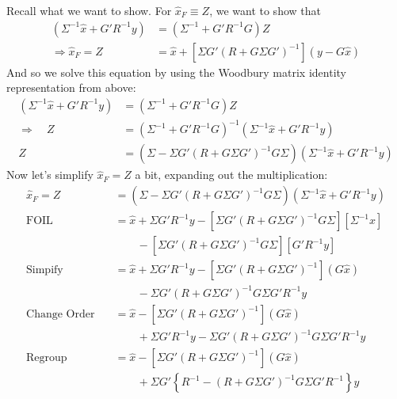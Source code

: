 \documentclass[a4paper,12pt]{article}
\begin{document}
Recall what we want to show.  For $\hat{x}_F \equiv Z$, we want
to show that
\begin{align*}
    (\Sigma^{-1} \hat{x} + G'R^{-1}y) 
	&= \left( \Sigma^{-1} + G'R^{-1}G\right) Z \\
    \Rightarrow 
    \hat{x}_F = Z 
        &= \hat{x} 
        + \left[\Sigma G' (R + G \Sigma G')^{-1}  \right]
        \left( y - G \hat{x} \right)  
\end{align*}
And so we solve this equation by using the Woodbury matrix
identity representation from above:
\begin{align*}
    (\Sigma^{-1} \hat{x} + G'R^{-1}y) &= 
	\left( \Sigma^{-1} + G'R^{-1}G\right) Z \\
    \Rightarrow \quad Z &=
	\left( \Sigma^{-1} + G'R^{-1}G\right)^{-1} 
	(\Sigma^{-1} \hat{x} + G'R^{-1}y) \\
    Z &= 
	\left( \Sigma - \Sigma G'(R 
	+ G\Sigma G')^{-1}
	G\Sigma\right) \left(\Sigma^{-1} \hat{x} 
	+ G'R^{-1}y\right)
\end{align*}
Now let's simplify $\hat{x}_F = Z$ a bit, 
expanding out the multiplication:
\begin{align*}
    \hat{x}_F = Z &= 
	\left( \Sigma - \Sigma G'(R 
	+ G\Sigma G')^{-1}
	G\Sigma\right) \left(\Sigma^{-1} \hat{x} 
	+ G'R^{-1}y\right) \\
    \text{FOIL} \quad &= \hat{x} + \Sigma G' R^{-1} y - 
	\left[\Sigma G' (R + G \Sigma G')^{-1} G \Sigma\right]
	\left[ \Sigma^{-1} \hat{x} \right]  \\
    &\qquad - \left[\Sigma G' (R+ G \Sigma G')^{-1}G\Sigma \right]
	\left[G' R^{-1} y \right] \\
    \text{Simpify} \quad &= \hat{x} + \Sigma G' R^{-1} y - 
	\left[\Sigma G' (R + G \Sigma G')^{-1}  \right]
	\left( G \hat{x} \right)  \\
    &\qquad - \Sigma G' (R+ G \Sigma G')^{-1}G\Sigma 
	G' R^{-1} y  \\
    \text{Change Order} \quad &= \hat{x} 
	- \left[\Sigma G' (R + G \Sigma G')^{-1}  \right]
	\left( G \hat{x} \right)  \\
    &\qquad 
	+ \Sigma G'  R^{-1} y 
	- \Sigma G' (R+ G \Sigma G')^{-1}G\Sigma  
	G' R^{-1} y \\
    \text{Regroup} \quad &= \hat{x} 
	- \left[\Sigma G' (R + G \Sigma G')^{-1}  \right]
	\left( G \hat{x} \right)  \\
    &\qquad 
	+ \Sigma G'  \left\{ R^{-1}  
	-  (R+ G \Sigma G')^{-1}G\Sigma  
	G' R^{-1} \right\} y 
\end{align*}
\end{document}

